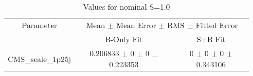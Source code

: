 \begin{table}
\centering
\caption{Values for nominal S=1.0}
\begin{tabular}{ccc}
\toprule
Parameter & \multicolumn{2}{c}{Mean $\pm$ Mean Error $\pm$ RMS $\pm$ Fitted Error}\\
 & B-Only Fit & S+B Fit\\
\midrule
CMS\_scale\_1p25j & \num{0.206833} $\pm$ \num{0} $\pm$ \num{0} $\pm$ \num{0.223353} & \num{0} $\pm$ \num{0} $\pm$ \num{0} $\pm$ \num{0.343106}\\
\bottomrule
\end{tabular}
\end{table}